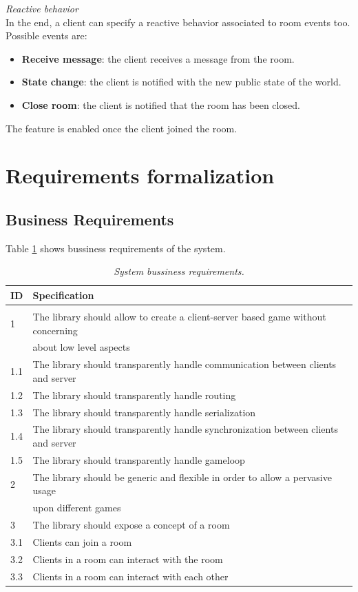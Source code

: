 \bigskip
\textit{Reactive behavior}
\\
In the end, a client can specify a reactive behavior associated to room events too. Possible events are:
\begin{itemize}
\item \textbf{Receive message}: the client receives a message from the room.
\item \textbf{State change}: the client is notified with the new public state of the world.
\item \textbf{Close room}: the client is notified that the room has been closed.
\end{itemize} 
The feature is enabled once the client joined the room. 

\section{Requirements formalization}

\subsection{Business Requirements}

Table \ref{table:buss-req} shows bussiness requirements of the system.

\begin{center}
  \begin{longtable}{|l|l|} 
  \caption{\textit{System bussiness requirements.}} \label{table:buss-req} \\
   
\hline
ID   &  Specification \\
\hline
\multicolumn{2}{|c|}{} \\
\hline
1   & The library should allow to create a client-server based game without concerning \\ 
    & about low level aspects \\
1.1 & The library should transparently handle communication between clients and server \\
1.2 & The library should transparently handle routing \\
1.3 & The library should transparently handle serialization \\
1.4 & The library should transparently handle synchronization between clients and server \\
1.5 & The library should transparently handle gameloop \\
2   & The library should be generic and flexible in order to allow a pervasive usage \\
    & upon different games \\    
3   & The library should expose a concept of a room \\
3.1 & Clients can join a room \\
3.2 & Clients in a room can interact with the room \\
3.3 & Clients in a room can interact with each other \\
\hline

  \end{longtable}
\end{center}

